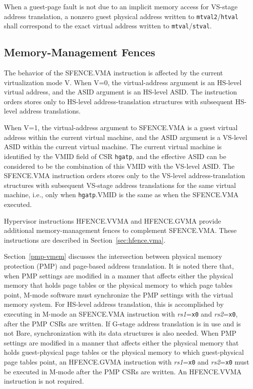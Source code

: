 When a guest-page fault is not due to an implicit
memory access for VS-stage address translation,
a nonzero guest physical address written to
{\tt mtval2}/{\tt htval} shall correspond
to the exact virtual address written to
{\tt mtval}/{\tt stval}.

\subsection{Memory-Management Fences}

The behavior of the SFENCE.VMA instruction is affected by the current
virtualization mode V.  When V=0, the virtual-address argument is an HS-level
virtual address, and the ASID argument is an HS-level ASID.
The instruction orders stores only to HS-level address-translation structures
with subsequent HS-level address translations.

When V=1, the virtual-address argument to SFENCE.VMA is a guest virtual
address within the current virtual machine, and the ASID argument is a VS-level
ASID within the current virtual machine.
The current virtual machine is identified by the VMID field of CSR {\tt hgatp},
and the effective ASID can be considered to be the combination of this VMID
with the VS-level ASID.
The SFENCE.VMA instruction orders stores only to the VS-level
address-translation structures with subsequent VS-stage address translations
for the same virtual machine, i.e., only when {\tt hgatp}.VMID is the same as
when the SFENCE.VMA executed.

Hypervisor instructions HFENCE.VVMA and HFENCE.GVMA provide additional
memory-management fences to complement SFENCE.VMA.
These instructions are described in Section~\ref{sec:hfence.vma}.

Section~\ref{pmp-vmem} discusses the intersection between physical memory
protection (PMP) and page-based address translation.
It is noted there that, when PMP settings are modified in a manner that affects
either the physical memory that holds page tables or the physical memory to
which page tables point, M-mode software must synchronize the PMP settings with
the virtual memory system.
For HS-level address translation, this is accomplished by executing in M-mode
an SFENCE.VMA instruction with {\em rs1}={\tt x0} and {\em rs2}={\tt x0}, after
the PMP CSRs are written.
If G-stage address translation is in use and is not Bare,
synchronization with its data
structures is also needed.
When PMP settings are modified in a manner that affects either the physical
memory that holds guest-physical page tables or the physical memory to which
guest-physical page tables point, an HFENCE.GVMA instruction with
{\em rs1}={\tt x0} and {\em rs2}={\tt x0} must be executed in M-mode after the
PMP CSRs are written.
An HFENCE.VVMA instruction is not required.

